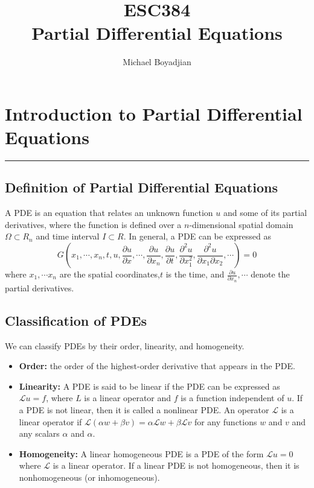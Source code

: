 \documentclass[11pt]{article}
\newcommand{\Lagr}{\mathcal{L}}
\begin{document}
\title{ESC384  \\ Partial Differential Equations}
\author{Michael Boyadjian}
\maketitle
\pagebreak

\tableofcontents

\pagebreak

\bigskip
\bigskip
\bigskip

\section{Introduction to Partial Differential Equations}
\hrule \vspace{15pt}

\subsection{Definition of Partial Differential Equations}
A PDE is an equation that relates an unknown function $u$ and some of its partial derivatives, where the function is defined over a $n$-dimensional spatial domain $\Omega \subset R_n$ and time interval $I \subset R$. In general, a PDE can be expressed as
$$ G \left( x_1, \cdots, x_n,t,u,\frac{\partial u}{\partial x}, \cdots, \frac{\partial u}{\partial x_n},  \frac{\partial u}{\partial t}, \frac{\partial^2 u }{\partial x_1^2}, \frac{\partial^2 u }{\partial x_1 \partial x_2}, \cdots \right) = 0$$
where $x_1,  \cdots x_n$ are the spatial coordinates,$t$ is the time, and $\frac{\partial u}{\partial x_n}, \cdots$ denote the partial derivatives.  


\subsection{Classification of PDEs}
We can classify PDEs by their order, linearity, and homogeneity. 
\begin{itemize}
\item \textbf{Order:}  the order of the highest-order derivative that appears in the PDE.
\item \textbf{Linearity:} A PDE is said to be linear if the PDE can be expressed as $ \Lagr u = f$, where $L$ is a linear operator and $f$ is a function independent of $u$. If a PDE is not linear, then it
is called a nonlinear PDE.  An operator $\Lagr$ is a linear operator if $\Lagr(\alpha w + \beta v) = \alpha \Lagr w + \beta \Lagr v $
for any functions $w$ and $v$ and any scalars $\alpha$ and $\alpha$.
\item \textbf{Homogeneity:} A linear homogeneous PDE is a PDE of the form $\Lagr u = 0$ where $\Lagr$ is a linear operator.  If a linear PDE is not homogeneous, then it is nonhomogeneous (or inhomogeneous).
\end{itemize}
\end{document}
